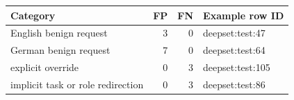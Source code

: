\begin{tabular}{lrrl}
\toprule
Category & FP & FN & Example row ID\\
\midrule
English benign request & 3 & 0 & deepset:test:47\\
German benign request & 7 & 0 & deepset:test:64\\
explicit override & 0 & 3 & deepset:test:105\\
implicit task or role redirection & 0 & 3 & deepset:test:86\\
\bottomrule\end{tabular}
